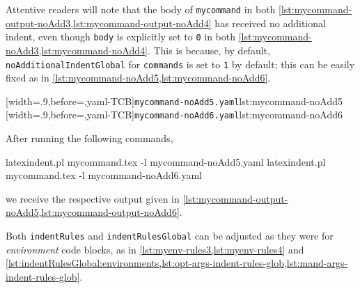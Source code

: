 \documentclass[10pt]{article}
\begin{document}
 \begin{example}
 Attentive readers will note that the body of \texttt{mycommand} in both
 \cref{lst:mycommand-output-noAdd3,lst:mycommand-output-noAdd4} has received no
 additional indent, even though \texttt{body} is explicitly set to \texttt{0} in both
 \cref{lst:mycommand-noAdd3,lst:mycommand-noAdd4}. This is because, by default,
 \texttt{noAdditionalIndentGlobal} for \texttt{commands} is set to \texttt{1} by default;
 this can be easily fixed as in
 \cref{lst:mycommand-noAdd5,lst:mycommand-noAdd6}.\label{page:command:noAddGlobal}

 \begin{cmhtcbraster}
  [width=.9\linewidth,before=\centering,yaml-TCB]{\texttt{mycommand-noAdd5.yaml}}{lst:mycommand-noAdd5}
  [width=.9\linewidth,before=\centering,yaml-TCB]{\texttt{mycommand-noAdd6.yaml}}{lst:mycommand-noAdd6}
 \end{cmhtcbraster}

 After running the following commands, 

 \begin{commandshell}
latexindent.pl mycommand.tex -l mycommand-noAdd5.yaml  
latexindent.pl mycommand.tex -l mycommand-noAdd6.yaml  
\end{commandshell}

 we receive the respective output given in
 \cref{lst:mycommand-output-noAdd5,lst:mycommand-output-noAdd6}.

 \begin{cmhtcbraster}
 \end{cmhtcbraster}
 \end{example}

 Both \texttt{indentRules} and \texttt{indentRulesGlobal} can be adjusted as they were
 for \emph{environment} code blocks, as in \vref{lst:myenv-rules3,lst:myenv-rules4} and
 \vref{lst:indentRulesGlobal:environments,lst:opt-args-indent-rules-glob,lst:mand-args-indent-rules-glob}.
\end{document}
